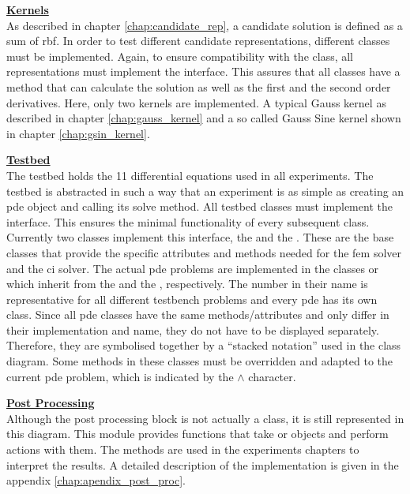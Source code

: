 \documentclass[./\jobname.tex]{subfiles}
\begin{document}
\large \underline{\textbf{Kernels}} \\
As described in chapter \ref{chap:candidate_rep}, a candidate solution is defined as a sum of \gls{rbf}. In order to test different candidate representations, different classes must be implemented. Again, to ensure compatibility with the  class, all representations must implement the  interface. This assures that all classes have a method that can calculate the solution as well as the first and the second order derivatives. Here, only two kernels are implemented. A typical Gauss kernel as described in chapter \ref{chap:gauss_kernel} and a so called Gauss Sine kernel shown in chapter \ref{chap:gsin_kernel}. 

\large \underline{\textbf{Testbed}} \\
The testbed holds the 11 differential equations used in all experiments. The testbed is abstracted in such a way that an experiment is as simple as creating an \gls{pde} object and calling its solve method. All testbed classes must implement the  interface. This ensures the minimal functionality of every subsequent class. Currently two classes implement this interface, the  and the . These are the base classes that provide the specific attributes and methods needed for the \gls{fem} solver and the \gls{ci} solver. The actual \gls{pde} problems are implemented in the classes  or  which inherit from the  and the , respectively. The number in their name is representative for all different testbench problems and every \gls{pde} has its own class. Since all \gls{pde} classes have the same methods/attributes and only differ in their implementation and name, they do not have to be displayed separately. Therefore, they are symbolised together by a ``stacked notation'' used in the class diagram. Some methods in these classes must be overridden and adapted to the current \gls{pde} problem, which is indicated by the $\land$ character.

\large \underline{\textbf{Post Processing}} \\
Although the post processing block is not actually a class, it is still represented in this diagram. This module provides functions that take  or  objects and perform actions with them. The methods are used in the experiments chapters to interpret the results. A detailed description of the implementation is given in the appendix \ref{chap:apendix_post_proc}.
\end{document}
